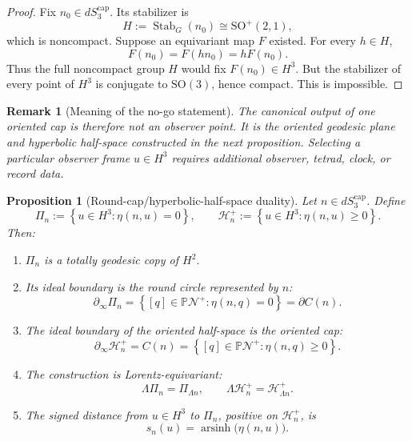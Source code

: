 \documentclass[11pt]{article}
\newtheorem{proposition}[theorem]{Proposition}
\newtheorem{remark}[theorem]{Remark}
\begin{document}
\begin{proof}
Fix \(n_0\in dS_3^{\mathrm{cap}}\). Its stabilizer is
\[
H:=\operatorname{Stab}_G(n_0)\cong\mathrm{SO}^{+}(2,1),
\]
which is noncompact. Suppose an equivariant map \(F\) existed. For every
\(h\in H\),
\[
F(n_0)=F(hn_0)=hF(n_0).
\]
Thus the full noncompact group \(H\) would fix \(F(n_0)\in H^3\). But the
stabilizer of every point of \(H^3\) is conjugate to \(\mathrm{SO}(3)\), hence
compact. This is impossible.
\end{proof}

\begin{remark}[Meaning of the no-go statement]\label{rem:cap-point-no-go-meaning}
The canonical output of one oriented cap is therefore not an observer point.
It is the oriented geodesic plane and hyperbolic half-space constructed in the
next proposition. Selecting a particular observer frame \(u\in H^3\) requires
additional observer, tetrad, clock, or record data.
\end{remark}

\begin{proposition}[Round-cap/hyperbolic-half-space duality]
\label{prop:cap-h3-duality}
Let \(n\in dS_3^{\mathrm{cap}}\). Define
\[
\Pi_n:=\left\{u\in H^3:\eta(n,u)=0\right\},
\qquad
\mathcal H_n^+:=\left\{u\in H^3:\eta(n,u)\geq0\right\}.
\]
Then:
\begin{enumerate}[leftmargin=2em]
\item \(\Pi_n\) is a totally geodesic copy of \(H^2\).
\item Its ideal boundary is the round circle represented by \(n\):
\[
\partial_\infty\Pi_n=
\left\{[q]\in\mathbb P\mathcal N^+:\eta(n,q)=0\right\}
=\partial C(n).
\]
\item The ideal boundary of the oriented half-space is the oriented cap:
\[
\partial_\infty\mathcal H_n^+
=C(n)
=\left\{[q]\in\mathbb P\mathcal N^+:\eta(n,q)\geq0\right\}.
\]
\item The construction is Lorentz-equivariant:
\[
\Lambda\Pi_n=\Pi_{\Lambda n},
\qquad
\Lambda\mathcal H_n^+=\mathcal H_{\Lambda n}^+.
\]
\item The signed distance from \(u\in H^3\) to \(\Pi_n\), positive on
\(\mathcal H_n^+\), is
\[
\boxed{
s_n(u)=\operatorname{arsinh}\!\bigl(\eta(n,u)\bigr).
}
\]
\end{enumerate}
\end{proposition}
\end{document}
